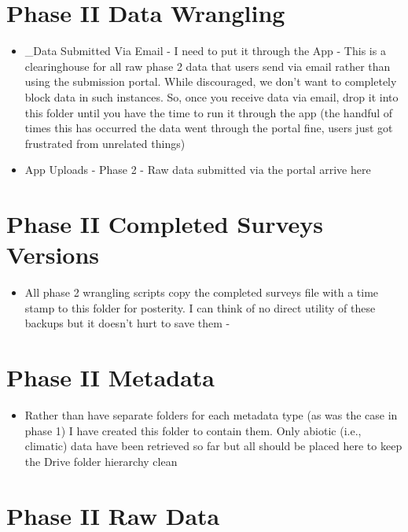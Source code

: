 \documentclass[
  letterpaper,
  oneside,
  open=any]{scrbook}
\providecommand{\tightlist}{%
  \setlength{\itemsep}{0pt}\setlength{\parskip}{0pt}}\usepackage{longtable,booktabs,array}
\begin{document}
\section{Phase II Data Wrangling}\label{phase-ii-data-wrangling}

\begin{itemize}
\item
  \_Data Submitted Via Email - I need to put it through the App - This
  is a clearinghouse for all raw phase 2 data that users send via email
  rather than using the submission portal. While discouraged, we don't
  want to completely block data in such instances. So, once you receive
  data via email, drop it into this folder until you have the time to
  run it through the app (the handful of times this has occurred the
  data went through the portal fine, users just got frustrated from
  unrelated things)
\item
  App Uploads - Phase 2 - Raw data submitted via the portal arrive here
\end{itemize}

\section{Phase II Completed Surveys
Versions}\label{phase-ii-completed-surveys-versions}

\begin{itemize}
\tightlist
\item
  All phase 2 wrangling scripts copy the completed surveys file with a
  time stamp to this folder for posterity. I can think of no direct
  utility of these backups but it doesn't hurt to save them -
\end{itemize}

\section{Phase II Metadata}\label{phase-ii-metadata}

\begin{itemize}
\tightlist
\item
  Rather than have separate folders for each metadata type (as was the
  case in phase 1) I have created this folder to contain them. Only
  abiotic (i.e., climatic) data have been retrieved so far but all
  should be placed here to keep the Drive folder hierarchy clean
\end{itemize}

\section{Phase II Raw Data}\label{phase-ii-raw-data}
\end{document}
